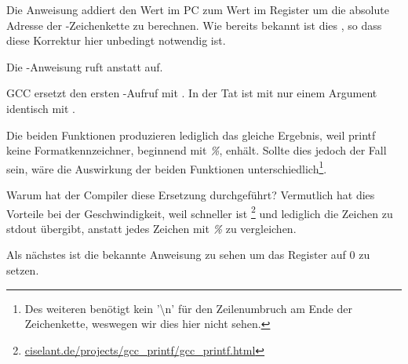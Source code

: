 
Die Anweisung  addiert den Wert im \ac{PC} zum Wert im Register 
um die absolute Adresse der -Zeichenkette zu berechnen.
Wie bereits bekannt ist dies \q{\PICcode}, so dass diese Korrektur hier unbedingt notwendig ist.

Die -Anweisung ruft \puts anstatt \printf auf.

\label{puts}

GCC ersetzt den ersten \printf-Aufruf mit \puts. In der Tat ist \printf mit nur einem
Argument identisch mit \puts.

Die beiden Funktionen produzieren lediglich das gleiche Ergebnis, weil printf keine
Formatkennzeichner, beginnend mit \emph{\%}, enhält.
Sollte dies jedoch der Fall sein, wäre die Auswirkung der beiden Funktionen
unterschiedlich\footnote{Des weiteren benötigt \puts kein '\textbackslash{}n'
für den Zeilenumbruch am Ende der Zeichenkette, weswegen wir dies hier nicht sehen.}.

Warum hat der Compiler diese Ersetzung durchgeführt? Vermutlich hat dies Vorteile bei
der Geschwindigkeit, weil \puts schneller ist
\footnote{\href{http://go.yurichev.com/17063}{ciselant.de/projects/gcc\_printf/gcc\_printf.html}}
und lediglich die Zeichen zu \gls{stdout} übergibt, anstatt jedes Zeichen mit \emph{\%} zu vergleichen.

Als nächstes ist die bekannte Anweisung  zu sehen um das Register  auf 0 zu setzen.
